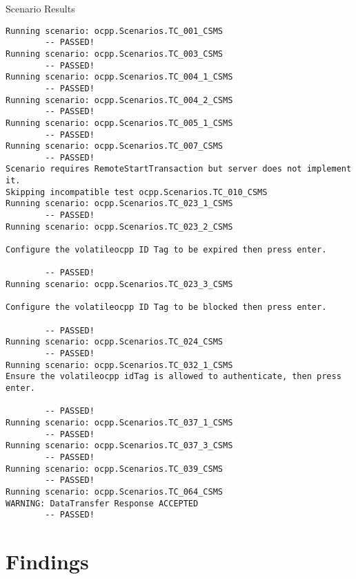 \documentclass{scrartcl}
\begin{document}
\begin{sectionbox}{Scenario Results}
  \begin{verbatim}
Running scenario: ocpp.Scenarios.TC_001_CSMS
        -- PASSED!
Running scenario: ocpp.Scenarios.TC_003_CSMS
        -- PASSED!
Running scenario: ocpp.Scenarios.TC_004_1_CSMS
        -- PASSED!
Running scenario: ocpp.Scenarios.TC_004_2_CSMS
        -- PASSED!
Running scenario: ocpp.Scenarios.TC_005_1_CSMS
        -- PASSED!
Running scenario: ocpp.Scenarios.TC_007_CSMS
        -- PASSED!
Scenario requires RemoteStartTransaction but server does not implement it.
Skipping incompatible test ocpp.Scenarios.TC_010_CSMS
Running scenario: ocpp.Scenarios.TC_023_1_CSMS
        -- PASSED!
Running scenario: ocpp.Scenarios.TC_023_2_CSMS

Configure the volatileocpp ID Tag to be expired then press enter.

        -- PASSED!
Running scenario: ocpp.Scenarios.TC_023_3_CSMS

Configure the volatileocpp ID Tag to be blocked then press enter.

        -- PASSED!
Running scenario: ocpp.Scenarios.TC_024_CSMS
        -- PASSED!
Running scenario: ocpp.Scenarios.TC_032_1_CSMS
Ensure the volatileocpp idTag is allowed to authenticate, then press enter.

        -- PASSED!
Running scenario: ocpp.Scenarios.TC_037_1_CSMS
        -- PASSED!
Running scenario: ocpp.Scenarios.TC_037_3_CSMS
        -- PASSED!
Running scenario: ocpp.Scenarios.TC_039_CSMS
        -- PASSED!
Running scenario: ocpp.Scenarios.TC_064_CSMS
WARNING: DataTransfer Response ACCEPTED
        -- PASSED!

    \end{verbatim}
\end{sectionbox}
\newpage

\section*{Findings}
\end{document}
